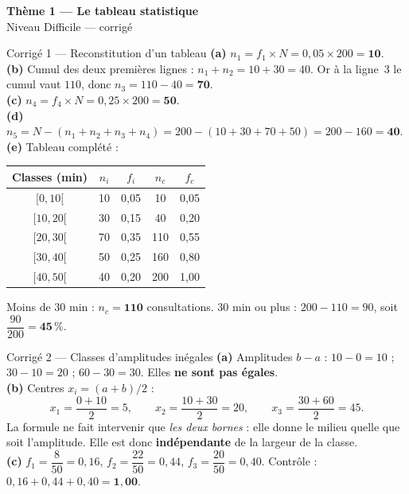 \documentclass[11pt,a4paper]{article}
\newcommand{\bandeau}[2]{%
\begin{tcolorbox}[boxbase,colback=primary,colframe=primarydark,halign=center,
   before skip=2pt,after skip=12pt]
{\LARGE\bfseries\color{white} #1}\\[3pt]{\normalsize\color{white} #2}
\end{tcolorbox}}
\begin{document}
\bandeau{Thème 1 — Le tableau statistique}{Niveau Difficile — corrigé}

\begin{corbox}{Corrigé 1 — Reconstitution d'un tableau}
\textbf{(a)} $n_1=f_1\times N=0{,}05\times 200=\mathbf{10}$.\\[2pt]
\textbf{(b)} Cumul des deux premières lignes : $n_1+n_2=10+30=40$. Or à la ligne~3 le cumul vaut
$110$, donc $n_3=110-40=\mathbf{70}$.\\[2pt]
\textbf{(c)} $n_4=f_4\times N=0{,}25\times200=\mathbf{50}$.\\[2pt]
\textbf{(d)} $n_5=N-(n_1+n_2+n_3+n_4)=200-(10+30+70+50)=200-160=\mathbf{40}$.\\[2pt]
\textbf{(e)} Tableau complété :
\begin{center}
\renewcommand{\arraystretch}{1.2}
\begin{tabular}{|c|c|c|c|c|}
\hline
\rowcolor{primary!18}
Classes (min) & $n_i$ & $f_i$ & $n_c$ & $f_c$ \\\hline
$[0,10[$   & 10 & 0{,}05 & 10  & 0{,}05 \\
$[10,20[$  & 30 & 0{,}15 & 40  & 0{,}20 \\
$[20,30[$  & 70 & 0{,}35 & 110 & 0{,}55 \\
$[30,40[$  & 50 & 0{,}25 & 160 & 0{,}80 \\
$[40,50[$  & 40 & 0{,}20 & 200 & 1{,}00 \\\hline
\end{tabular}
\end{center}
Moins de $30$ min : $n_c=\mathbf{110}$ consultations. \; $30$ min ou plus :
$200-110=90$, soit $\dfrac{90}{200}=\mathbf{45\,\%}$.
\end{corbox}

\begin{corbox}{Corrigé 2 — Classes d'amplitudes inégales}
\textbf{(a)} Amplitudes $b-a$ : $10-0=10$ ; $30-10=20$ ; $60-30=30$. Elles \textbf{ne sont pas égales}.\\[2pt]
\textbf{(b)} Centres $x_i=(a+b)/2$ :
\[
x_1=\frac{0+10}{2}=5,\qquad x_2=\frac{10+30}{2}=20,\qquad x_3=\frac{30+60}{2}=45 .
\]
La formule ne fait intervenir que \emph{les deux bornes} : elle donne le milieu quelle que soit
l'amplitude. Elle est donc \textbf{indépendante} de la largeur de la classe.\\[2pt]
\textbf{(c)} $f_1=\dfrac{8}{50}=0{,}16$, $f_2=\dfrac{22}{50}=0{,}44$, $f_3=\dfrac{20}{50}=0{,}40$.
Contrôle : $0{,}16+0{,}44+0{,}40=\mathbf{1{,}00}$. \checkmark
\end{corbox}
\end{document}
